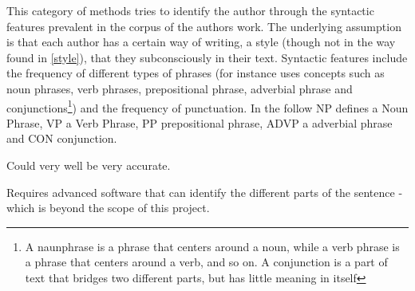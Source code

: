 {\label{syntactic}
This category of methods tries to identify the author through the syntactic
features prevalent in the corpus of the authors
work. The underlying assumption is that each author has a certain way of writing, a style (though not in the way found in \ref{style}), that they subconsciously in their text. Syntactic features include the frequency of different types of phrases (for instance \cite{style} uses concepts such as noun phrases, verb phrases, prepositional phrase, adverbial phrase and conjunctions\footnote{A naunphrase is a phrase that centers around a noun, while a verb phrase is a phrase that centers around a verb, and so on. A conjunction is a part of text that bridges two different parts, but has little meaning in itself}) and the frequency of punctuation.
} 
{
In the follow NP defines a Noun Phrase, VP a Verb Phrase, PP prepositional phrase, ADVP a adverbial phrase and CON conjunction.\\
}
{
\item Could very well be very accurate.
}{
\item Requires advanced software that can identify the different parts of the sentence - which is beyond the scope of this project.

}

